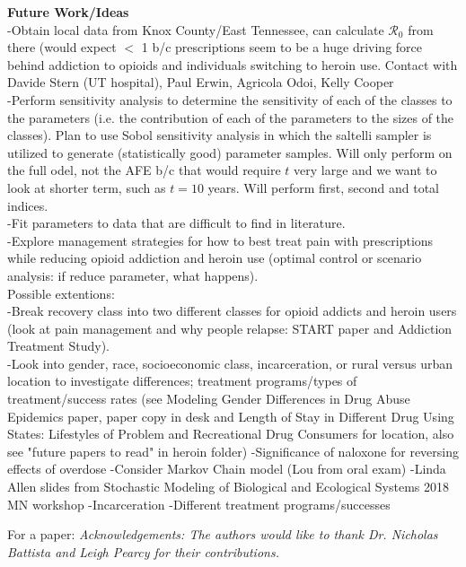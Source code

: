 \documentclass[12pt]{article}
\begin{document}
\textbf{Future Work/Ideas} \\
-Obtain local data from Knox County/East Tennessee, can calculate $\mathscr{R}_0$ from there (would expect $<$ 1 b/c prescriptions seem to be a huge driving force behind addiction to opioids and individuals switching to heroin use. Contact with Davide Stern (UT hospital), Paul Erwin, Agricola Odoi, Kelly Cooper\\
-Perform sensitivity analysis to determine the sensitivity of each of the classes to the parameters (i.e. the contribution of each of the parameters to the sizes of the classes). Plan to use Sobol sensitivity analysis in which the saltelli sampler is utilized to generate (statistically good) parameter samples. Will only perform on the full  odel, not the AFE b/c that would require $t$ very large and we want to look at shorter term, such as $t=10$ years. Will perform first, second and total indices. \\
-Fit parameters to data that are difficult to find in literature. \\
-Explore management strategies for how to best treat pain with prescriptions while reducing opioid addiction and heroin use (optimal control or scenario analysis: if reduce parameter, what happens).  \\
Possible extentions: \\
-Break recovery class into two different classes for opioid addicts and heroin users (look at pain management and why people relapse: START paper and Addiction Treatment Study). \\
-Look into gender, race, socioeconomic class, incarceration, or rural versus urban location to investigate differences; treatment programs/types of treatment/success rates (see Modeling Gender Differences in Drug Abuse Epidemics paper, paper copy in desk and Length of Stay in Different Drug Using States: Lifestyles of Problem and Recreational Drug Consumers for location, also see "future papers to read" in heroin folder)
-Significance of naloxone for reversing effects of overdose 
-Consider Markov Chain model (Lou from oral exam) 
-Linda Allen slides from Stochastic Modeling of Biological and Ecological Systems 2018 MN workshop 
-Incarceration 
-Different treatment programs/successes 

For a paper: \textit{Acknowledgements: The authors would like to thank Dr. Nicholas Battista and Leigh Pearcy for their contributions.}
\end{document}

